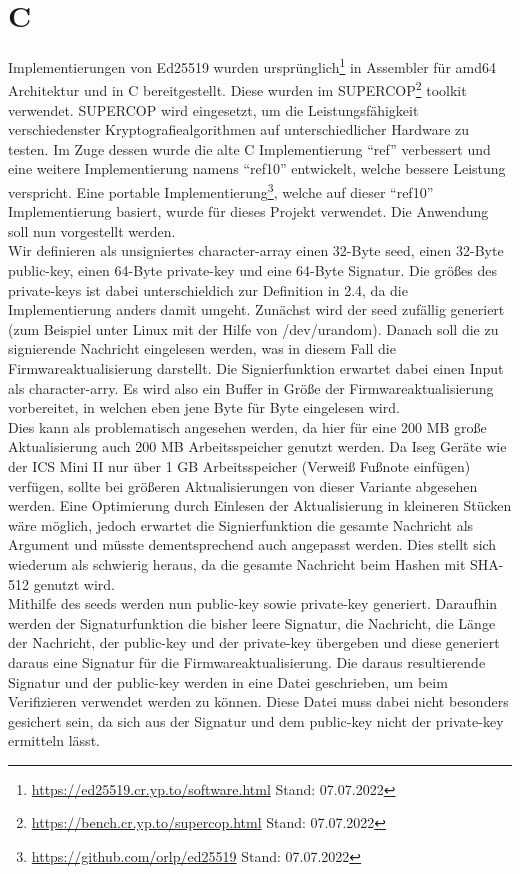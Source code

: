 \documentclass[thesis=bachelor,faculty=cb]{hsmw-thesis}
\begin{document}
{	\section{C}
	Implementierungen von Ed25519 wurden ursprünglich\footnote{\url{https://ed25519.cr.yp.to/software.html} Stand: 07.07.2022} in Assembler für amd64 Architektur und in C bereitgestellt. Diese wurden im SUPERCOP\footnote{\url{https://bench.cr.yp.to/supercop.html} Stand: 07.07.2022} toolkit verwendet.
	SUPERCOP wird eingesetzt, um die Leistungsfähigkeit verschiedenster Kryptografiealgorithmen auf unterschiedlicher Hardware zu testen.
	Im Zuge dessen wurde die alte C Implementierung \enquote{ref} verbessert und eine weitere Implementierung namens \enquote{ref10} entwickelt, welche bessere Leistung verspricht. Eine portable Implementierung\footnote{\url{https://github.com/orlp/ed25519} Stand: 07.07.2022}, welche auf dieser \enquote{ref10} Implementierung basiert, wurde für dieses Projekt verwendet. Die Anwendung soll nun vorgestellt werden.
	\\[1cm]
	Wir definieren als unsigniertes character-array einen 32-Byte seed, einen 32-Byte public-key, einen 64-Byte private-key und eine 64-Byte Signatur. Die größes des private-keys ist dabei unterschieldich zur Definition in 2.4, da die Implementierung anders damit umgeht. Zunächst wird der seed zufällig generiert (zum Beispiel unter Linux mit der Hilfe von /dev/urandom). Danach soll die zu signierende Nachricht eingelesen werden, was in diesem Fall die Firmwareaktualisierung darstellt. Die Signierfunktion erwartet dabei einen Input als character-arry. Es wird also ein Buffer in Größe der Firmwareaktualisierung vorbereitet, in welchen eben jene Byte für Byte eingelesen wird. 
	\\[1cm]
	Dies kann als problematisch angesehen werden, da hier für eine 200 MB große Aktualisierung auch 200 MB Arbeitsspeicher genutzt werden. Da Iseg Geräte wie der ICS Mini II nur über 1 GB Arbeitsspeicher (Verweiß Fußnote einfügen) verfügen, sollte bei größeren Aktualisierungen von dieser Variante abgesehen werden. Eine Optimierung durch Einlesen der Aktualisierung in kleineren Stücken wäre möglich, jedoch erwartet die Signierfunktion die gesamte Nachricht als Argument und müsste dementsprechend auch angepasst werden. Dies stellt sich wiederum als schwierig heraus, da die gesamte Nachricht beim Hashen mit SHA-512 genutzt wird.
	\\[1cm]
	Mithilfe des seeds werden nun public-key sowie private-key generiert. Daraufhin werden der Signaturfunktion die bisher leere Signatur, die Nachricht, die Länge der Nachricht, der public-key und der private-key übergeben und diese generiert daraus eine Signatur für die Firmwareaktualisierung. Die daraus resultierende Signatur und der public-key werden in eine Datei geschrieben, um beim Verifizieren verwendet werden zu können. Diese Datei muss dabei nicht besonders gesichert sein, da sich aus der Signatur und dem public-key nicht der private-key ermitteln lässt.
}
\end{document}
